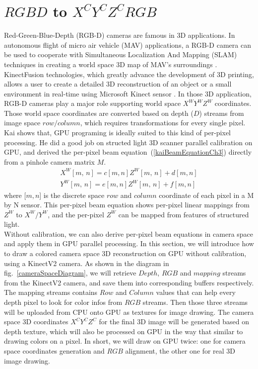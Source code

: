 \section{\(RGBD\) to \(X^CY^CZ^CRGB\)}
Red-Green-Blue-Depth (RGB-D) cameras are famous in 3D applications. In autonomous flight of micro air vehicle (MAV) applications, a RGB-D camera can be used to cooperate with Simultaneous Localization And Mapping (SLAM) techniques in creating a world space 3D map of MAV's surroundings \cite{RGBDSLAMmav_2013}. KinectFusion technologies, which greatly advance the development of 3D printing, allows a user to create a detailed 3D reconstruction of an object or a small environment in real-time using Microsoft Kinect sensor \cite{KinectFusionIzadi_2011}. In those 3D application, RGB-D cameras play a major role supporting world space \(X^WY^WZ^W\) coordinates. Those world space coordinates are converted based on  depth (\(D\)) streams from image space \(row/column\), which requires transformations for every single pixel. Kai \cite{Kai10} shows that, GPU programing is ideally suited to this kind of per-pixel processing. He did a good job on structed light 3D scanner parallel calibration on GPU, and derived the per-pixel beam equation~(\ref{kaiBeamEquationCh3}) directly from a pinhole camera matrix \(M\). 
%
\begin{equation}
\begin{aligned}
X^W[m,\,  n] = c[m, n]Z^W[m,\,  n]+d[m, n]
\\%
Y^W[m,\,  n] = e[m, n]Z^W[m,\,  n]+f[m, n]
\end{aligned}
\label{kaiBeamEquationCh3}
\end{equation}%
\noindent
where [\(m,n\)] is the discrete space \(row\) and \(column\) coordinate of each pixel in a M by N sensor. This per-pixel beam equation shows per-pixel linear mappings from \(Z^W\) to \(X^W/Y^W\), and the per-pixel \(Z^W\) can be mapped from features of structured light. 
\\\indent
Without calibration, we can also derive per-pixel beam equations in camera space and apply them in GPU parallel processing. In this section, we will introduce how to draw a colored camera space 3D reconstruction on GPU without calibration, using a KinectV2 camera. As shown in the diagram in fig.~\ref{cameraSpaceDiagram}, we will retrieve \(Depth\), \(RGB\) and \(mapping\) streams from the KinectV2 camera, and save them into corresponding buffers respectively. The mapping streams contains \(Row\) and \(Column\) values that can help every depth pixel to look for color infos from \(RGB\) streams. Then those three streams will be uploaded from CPU onto GPU as textures for image drawing. The camera space 3D coordinates \(X^CY^CZ^C\) for the final 3D image will be generated based on depth texture, which will also be processed on GPU in the way that similar to drawing colors on a pixel. In short, we will draw on GPU twice: one for camera space coordinates generation and \(RGB\) alignment, the other one for real 3D image drawing.
